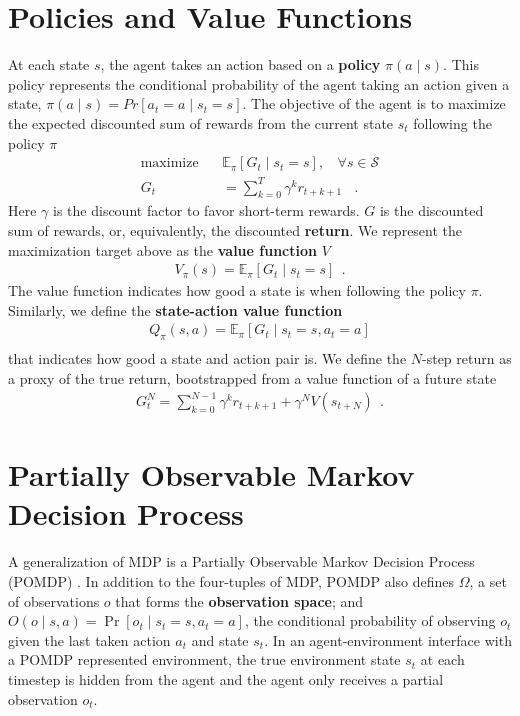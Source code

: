 \section{Policies and Value Functions} \label{sec:policies_and_functions}
At each state $s$, the agent takes an action based on a \textbf{policy} $\pi(a \mid s)$.
This policy represents the conditional probability of the agent taking an action given a state, $\pi(a \mid s) = Pr[ a_{t} = a \mid  s_t = s]$.
The objective of the agent is to maximize the expected discounted sum of rewards from the current state $s_t$ following the policy $\pi$
\begin{align}
    \text{maximize} ~~~~  & \mathbb{E}_{\pi}\left[ G_t \mid s_t = s \right] , ~~~~ \forall s \in \mathcal{S} \label{eq:maximize_return} \\
    G_t                   & = \sum_{k=0}^{T} \gamma^{k} r_{t+k+1} ~~~~ . 
\end{align}
Here $\gamma$ is the discount factor to favor short-term rewards.
$G$ is the discounted sum of rewards, or, equivalently, the discounted \textbf{return}.
We represent the maximization target above as the \textbf{value function} $V$
\begin{align*}
    V_\pi(s) = \mathbb{E}_{\pi}\left[ G_t \mid s_t = s \right] ~~.
\end{align*}
The value function indicates how good a state is when following the policy $\pi$.
Similarly, we define the \textbf{state-action value function}
\begin{align*}
    Q_\pi(s, a) = \mathbb{E}_{\pi}\left[ G_t \mid s_t = s, a_t = a \right]  \\
\end{align*}
that indicates how good a state and action pair is.
We define the $N$-step return as a proxy of the true return, bootstrapped from a value function of a future state
\begin{align*}
    G^N_t = \sum_{k=0}^{N - 1} \gamma^{k} r_{t+k+1} + \gamma^{N} V(s_{t+N}) ~~ .
\end{align*}

\section{Partially Observable Markov Decision Process} \label{sec:pomdp}
A generalization of MDP is a Partially Observable Markov Decision Process (POMDP) \cite{OptimalControlMarkov_Astrom_1965}.
In addition to the four-tuples of MDP, POMDP also defines $\Omega$, a set of observations $o$ that forms the \textbf{observation space}; and $O(o \mid s, a) = \operatorname{Pr}[o_t \mid s_t = s, a_t = a]$, the conditional probability of observing $o_t$ given the last taken action $a_t$ and state $s_t$.
In an agent-environment interface with a POMDP represented environment, the true environment state $s_t$ at each timestep is hidden from the agent and the agent only receives a partial observation $o_t$.

